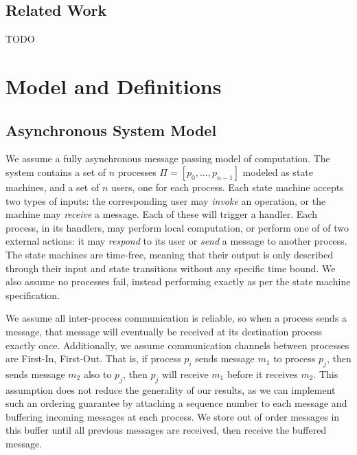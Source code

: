 \documentclass[a4paper,anonymous,USenglish]{lipics-v2021} %
\theoremstyle{definition}
\begin{document}
\subsection{Related Work}

TODO




\section{Model and Definitions}

\subsection{Asynchronous System Model}
We assume a fully asynchronous message passing model of computation.  The system contains a set of $n$ processes $\Pi = [p_0, \dots , p_{n-1}]$ modeled as state machines, and a set of $n$ users, one for each process.  Each state machine accepts two types of inputs: the corresponding user may \emph{invoke} an operation, or the machine may \emph{receive} a message.  Each of these will trigger a handler.  Each process, in its handlers, may perform local computation, or perform one of of two external actions: it may \emph{respond} to its user or \emph{send} a message to another process.  The state machines are time-free, meaning that their output is only described through their input and state transitions without any specific time bound.  We also assume no processes fail, instead performing exactly as per the state machine specification.  

We assume all inter-process communication is reliable, so when a process sends a message, that message will eventually be received at its destination process exactly once.  Additionally, we assume communication channels between processes are First-In, First-Out.  That is, if process $p_i$ sends message $m_1$ to process $p_j$, then sends message $m_2$ also to $p_j$, then $p_j$ will receive $m_1$ before it receives $m_2$.  This assumption does not reduce the generality of our results, as we can implement such an ordering guarantee by attaching a sequence number to each message and buffering incoming messages at each process.  We store out of order messages in this buffer until all previous messages are received, then receive the buffered message.
\end{document}
